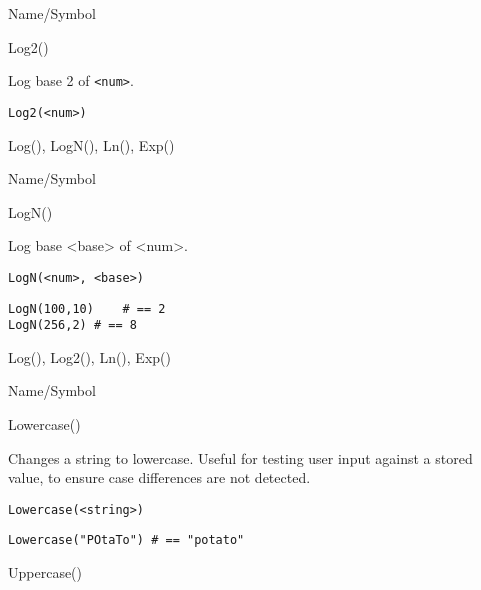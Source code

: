 \rl


\begin{desc}{Name/Symbol}
\item[Name/Symbol]	Log2()

\item[Description]	Log base 2 of \verb+<num>+.

\item[Usage]
\begin{verbatim}
Log2(<num>)
\end{verbatim}

\item[Example]	

\item[See Also]	Log(), LogN(), Ln(), Exp()
\end{desc}

\rl


\begin{desc}{Name/Symbol}
\item[Name/Symbol]	LogN()

\item[Description]	Log base <base> of <num>.

\item[Usage]
\begin{verbatim}
LogN(<num>, <base>)
\end{verbatim}

\item[Example]
\begin{verbatim}
LogN(100,10)	# == 2
LogN(256,2)	# == 8
\end{verbatim}

\item[See Also]	Log(), Log2(), Ln(), Exp()
\end{desc}

\rl


\begin{desc}{Name/Symbol}
\item[Name/Symbol]	Lowercase()

\item[Description]	Changes a string to lowercase.  Useful for testing user
		input against a stored value, to ensure case differences
		are not detected.

\item[Usage]
\begin{verbatim}
Lowercase(<string>)
\end{verbatim}

\item[Example]
\begin{verbatim}
Lowercase("POtaTo")	# == "potato"
\end{verbatim}

\item[See Also]	Uppercase()
\end{desc}

